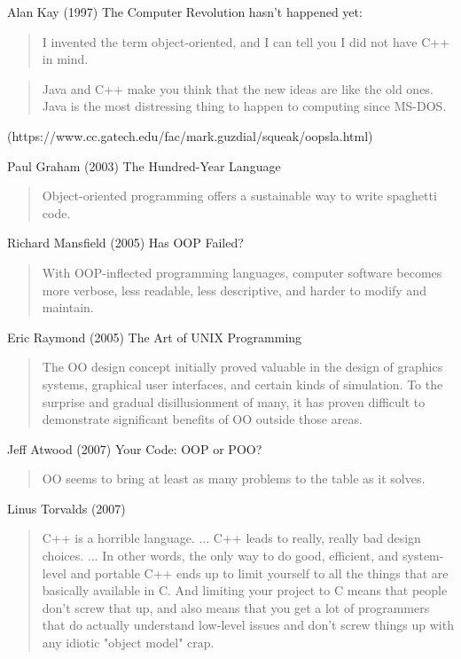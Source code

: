 \documentclass[12pt]{book}
\begin{document}
Alan Kay (1997) The Computer Revolution hasn't happened yet:
\begin{quote}
	I invented the term object-oriented, and I can tell you I did not have C++ in mind.
\end{quote}
\begin{quote}
	Java and C++ make you think that the new ideas are like the old ones. Java is the most distressing thing to happen to computing since MS-DOS.
\end{quote}

(https://www.cc.gatech.edu/fac/mark.guzdial/squeak/oopsla.html)

Paul Graham (2003)
The Hundred-Year Language
\begin{quote}
	Object-oriented programming offers a sustainable way to write spaghetti code.
\end{quote}

Richard Mansfield (2005)
Has OOP Failed?
\begin{quote}
	With OOP-inflected programming languages, computer software becomes more verbose, less readable, less descriptive, and harder to modify and maintain.
\end{quote}

Eric Raymond (2005)
The Art of UNIX Programming
\begin{quote}
	The OO design concept initially proved valuable in the design of graphics systems, graphical user interfaces, and certain kinds of simulation. To the surprise and gradual disillusionment of many, it has proven difficult to demonstrate significant benefits of OO outside those areas.
\end{quote}

Jeff Atwood (2007)
Your Code: OOP or POO?
\begin{quote}
	OO seems to bring at least as many problems to the table as it solves.
\end{quote}

Linus Torvalds (2007)
\begin{quote}
	C++ is a horrible language. ... C++ leads to really, really bad design choices. ... In other words, the only way to do good, efficient, and system-level and portable C++ ends up to limit yourself to all the things that are basically available in C. And limiting your project to C means that people don't screw that up, and also means that you get a lot of programmers that do actually understand low-level issues and don't screw things up with any idiotic "object model" crap.
\end{quote}
\end{document}
